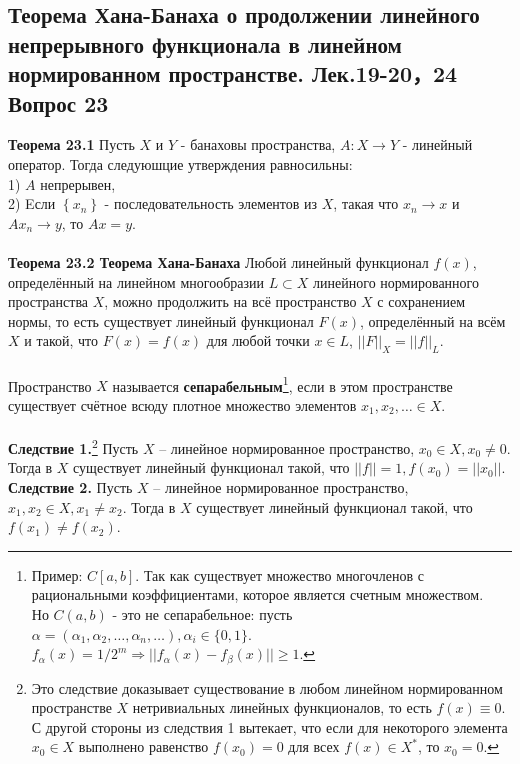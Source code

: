\documentclass{article}
\begin{document}
\subsection{Теорема Хана-Банаха о продолжении линейного непрерывного функционала в линейном нормированном пространстве. Лек.19-20，24 \textbf{Вопрос 23}}
	\textbf{Теорема 23.1} Пусть $X$ и $Y$ - банаховы пространства, $A: X\rightarrow Y$ - линейный оператор. Тогда следуюшцие утверждения равносильны:\\
	1) $A$ непрерывен,\\
	2) Eсли $\left\{x_{n}\right\}$ - последовательность элементов из $X$, такая что $x_{n}\rightarrow x$ и $Ax_{n}\rightarrow y$, то $Ax=y$.\\
	\\
	\textbf{Теорема 23.2 Теорема Хана-Банаха} Любой линейный функционал $f(x)$, определённый на линейном многообразии $L\subset X$ линейного
	нормированного пространства $X$, можно продолжить на всё пространство
	$X$ с сохранением нормы, то есть существует линейный функционал $F(x)$, определённый на всём $X$ и такой, что $F(x)=f(x)$ для любой точки $x\in L$, ${||F||}_{X}={||f||}_{L}$.\\
	\\
	Пространство $X$ называется \textbf{сепарабельным}\footnote{Пример: $C[a,b]$. Так как существует множество многочленов с рациональными коэффициентами, которое является счетным множеством. \\
	Но $C(a,b)$ - это не сепарабельное: пусть $\alpha=({\alpha}_{1},{\alpha}_{2},\ldots,{\alpha}_{n},\ldots), {\alpha}_{i}\in \{0,1\}$. ${f}_{\alpha}(x)=1/{2}^{m} \Rightarrow ||{f}_{\alpha}(x)-{f}_{\beta}(x)||\ge 1$.}, если в этом пространстве существует счётное всюду плотное множество элементов ${x}_{1},{x}_{2},\ldots \in X$.\\
	\\
	\textbf{Следствие 1.}\footnote{Это следствие доказывает существование в любом линейном нормированном пространстве $X$ нетривиальных линейных функционалов, то есть $f(x)\equiv 0$. С другой стороны из следствия 1 вытекает, что если для некоторого элемента ${x}_{0}\in X$ выполнено равенство $f({x}_{0})=0$ для всех $f(x)\in {X}^{*}$, то ${x}_{0}=0$.} Пусть $X$ – линейное нормированное пространство, ${x}_{0}\in X, {x}_{0}\ne 0$. Тогда в $X$ существует линейный функционал такой, что $||f||=1, f({x}_{0})=||{x}_{0}||$.\\
	\textbf{Следствие 2.} Пусть $X$ – линейное нормированное пространство, ${x}_{1},{x}_{2}\in X, {x}_{1}\ne {x}_{2}$. Тогда в $X$ существует линейный функционал такой, что $f({x}_{1})\ne f({x}_{2})$.\\
\end{document}
